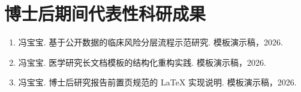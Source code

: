 \chapter*{博士后期间代表性科研成果}

\begin{enumerate}
  \item 冯宝宝. 基于公开数据的临床风险分层流程示范研究. 模板演示稿，2026.
  \item 冯宝宝. 医学研究长文档模板的结构化重构实践. 模板演示稿，2026.
  \item 冯宝宝. 博士后研究报告前置页规范的 LaTeX 实现说明. 模板演示稿，2026.
\end{enumerate}
